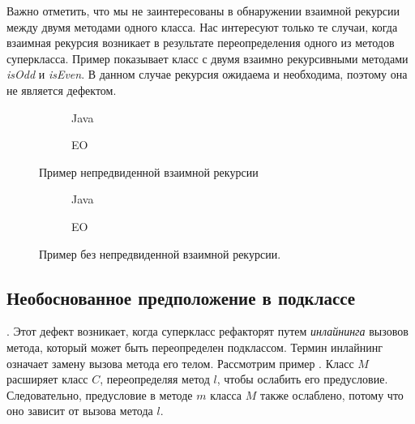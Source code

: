Важно отметить, что мы не заинтересованы в обнаружении взаимной рекурсии между двумя методами одного класса. Нас интересуют только те случаи, когда взаимная рекурсия возникает в результате переопределения одного из методов суперкласса. Пример  показывает класс с двумя взаимно рекурсивными методами \textit{isOdd} и \textit{isEven}. В данном случае рекурсия ожидаема и необходима, поэтому она не является дефектом.

\begin{figure}
    \centering
    \begin{subfigure}{0.4\textwidth}
        
        \caption{Java}
    \end{subfigure}
    \hfill
    \begin{subfigure}{0.4\textwidth}
        
        \caption{EO}
    \end{subfigure}
    \caption{Пример непредвиденной взаимной рекурсии}
    \label{fig:mutualrec_basic}
\end{figure}

\begin{figure}
    \centering
    \begin{subfigure}{0.4\textwidth}
        
        \caption{Java}
    \end{subfigure}
    \hfill
    \begin{subfigure}{0.4\textwidth}
        
        \caption{EO}
    \end{subfigure}
    \caption{Пример без непредвиденной взаимной рекурсии.}
    \label{fig:oddeven}
\end{figure}

\subsection{Необоснованное предположение в подклассе}.
Этот дефект \cite[Раздел 3.3]{fragilebaseclass} возникает, когда суперкласс рефакторят путем \textit{инлайнинга} вызовов метода, который может быть переопределен подклассом. Термин инлайнинг означает замену вызова метода его телом. Рассмотрим пример . Класс $M$ расширяет класс $C$, переопределяя метод $l$, чтобы ослабить его предусловие. Следовательно, предусловие в методе $m$ класса $M$ также ослаблено, потому что оно зависит от вызова метода $l$.

